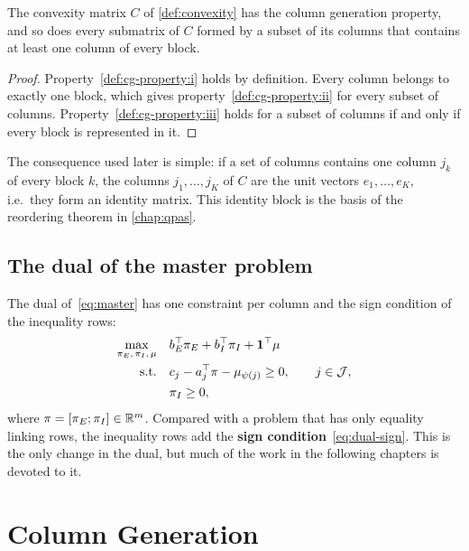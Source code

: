 \begin{lemma} \label{lem:cg-property}
The convexity matrix $C$ of \cref{def:convexity} has the column generation property, and so
does every submatrix of $C$ formed by a subset of its columns that contains at least one
column of every block.
\end{lemma}

\begin{proof}
Property~\ref{def:cg-property:i} holds by definition. Every column belongs to exactly one block, which gives
property~\ref{def:cg-property:ii} for every subset of columns. Property~\ref{def:cg-property:iii} holds for a subset of columns if
and only if every block is represented in it. 
\end{proof}

The consequence used later is simple: if a set of columns contains one column $j_k$ of every
block $k$, the columns $j_1,\dots,j_K$ of $C$ are the unit vectors $e_1,\dots,e_K$, i.e.\ they
form an identity matrix. This identity block is the basis of the reordering theorem in
\cref{chap:qpas}.

\subsection*{The dual of the master problem}

The dual of~\eqref{eq:master} has one constraint per column and the sign condition of the
inequality rows:
\begin{subequations} \label{eq:master-dual}
\begin{align}
\max_{\pi_E,\,\pi_I,\,\mu} \quad & b_E^\top \pi_E + b_I^\top\pi_I + \mathbf{1}^\top\mu \\
\text{s.t.} \quad & c_j - a_j^\top \pi - \mu_{\psi(j)} \ge 0, \qquad j\in\mathcal{J},
\label{eq:dual-columns}\\
& \pi_I \ge 0, \label{eq:dual-sign}
\end{align}
\end{subequations}
where $\pi = [\pi_E;\pi_I]\in\mathbb{R}^m$. Compared with a problem that has only equality linking
rows, the inequality rows add the \textbf{sign condition}~\eqref{eq:dual-sign}. This is the
only change in the dual, but much of the work in the following chapters is devoted to it.


\section{Column Generation}
\label{sec:column-generation}

